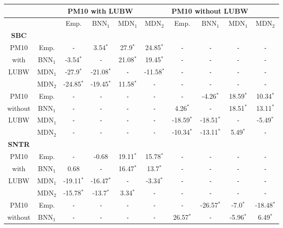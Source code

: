 \begin{tabular}{c|c|cccc||cccc} 
  \hline 
  \hline 
  &&\multicolumn{3}{c}{PM10 with LUBW} && \multicolumn{3}{c}{PM10 without LUBW} \\ 
  \hline 
  &&Emp.&BNN$_1$&MDN$_1$&MDN$_2$&Emp.&BNN$_1$&MDN$_1$&MDN$_2$ \\ 
  \hline 
  \hline 
  \textbf{SBC}&&&&&&& \\ 
  PM10&Emp.&\texttt{\--}&3.54$^*$&27.9$^*$&24.85$^*$&\texttt{\--}&\texttt{\--}&\texttt{\--}&\texttt{\--} \\ 
  with&BNN$_1$&-3.54$^*$&\texttt{\--}&21.08$^*$&19.45$^*$&\texttt{\--}&\texttt{\--}&\texttt{\--}&\texttt{\--} \\ 
  LUBW&MDN$_1$&-27.9$^*$&-21.08$^*$&\texttt{\--}&-11.58$^*$&\texttt{\--}&\texttt{\--}&\texttt{\--}&\texttt{\--} \\ 
  &MDN$_2$&-24.85$^*$&-19.45$^*$&11.58$^*$&\texttt{\--}&\texttt{\--}&\texttt{\--}&\texttt{\--}&\texttt{\--} \\ 
  \hline     
  PM10&Emp.&\texttt{\--}&\texttt{\--}&\texttt{\--}&\texttt{\--}&\texttt{\--}&-4.26$^*$&18.59$^*$&10.34$^*$ \\ 
  without&BNN$_1$&\texttt{\--}&\texttt{\--}&\texttt{\--}&\texttt{\--}&4.26$^*$&\texttt{\--}&18.51$^*$&13.11$^*$ \\ 
  LUBW&MDN$_1$&\texttt{\--}&\texttt{\--}&\texttt{\--}&\texttt{\--}&-18.59$^*$&-18.51$^*$&\texttt{\--}&-5.49$^*$ \\ 
  &MDN$_2$&\texttt{\--}&\texttt{\--}&\texttt{\--}&\texttt{\--}&-10.34$^*$&-13.11$^*$&5.49$^*$&\texttt{\--} \\ 
  \hline     
  \hline     
\textbf{SNTR}&&&&&&& \\ 
  PM10&Emp.&\texttt{\--}&-0.68&19.11$^*$&15.78$^*$&\texttt{\--}&\texttt{\--}&\texttt{\--}&\texttt{\--} \\ 
  with&BNN$_1$&0.68&\texttt{\--}&16.47$^*$&13.7$^*$&\texttt{\--}&\texttt{\--}&\texttt{\--}&\texttt{\--} \\ 
  LUBW&MDN$_1$&-19.11$^*$&-16.47$^*$&\texttt{\--}&-3.34$^*$&\texttt{\--}&\texttt{\--}&\texttt{\--}&\texttt{\--} \\ 
  &MDN$_2$&-15.78$^*$&-13.7$^*$&3.34$^*$&\texttt{\--}&\texttt{\--}&\texttt{\--}&\texttt{\--}&\texttt{\--} \\ 
  \hline     
  PM10&Emp.&\texttt{\--}&\texttt{\--}&\texttt{\--}&\texttt{\--}&\texttt{\--}&-26.57$^*$&-7.0$^*$&-18.48$^*$ \\ 
  without&BNN$_1$&\texttt{\--}&\texttt{\--}&\texttt{\--}&\texttt{\--}&26.57$^*$&\texttt{\--}&-5.96$^*$&6.49$^*$ \\ 

\end{tabular}
